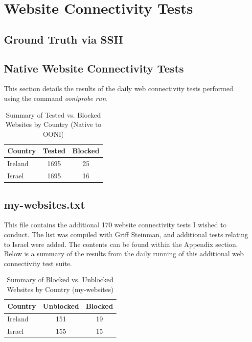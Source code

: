 \section{Website Connectivity Tests}


\subsection{Ground Truth via SSH}
\subsection{Native Website Connectivity Tests}
This section details the results of the daily web connectivity tests performed using the command \textit{ooniprobe run}. 

\begin{table}[H]
\centering
\caption{Summary of Tested vs. Blocked Websites by Country (Native to OONI)}
\begin{tabular}{lcc}
\toprule
\textbf{Country} & \textbf{Tested} & \textbf{Blocked} \\
\midrule
Ireland & 1695 & 25 \\
Israel    & 1695 & 16 \\   
\bottomrule
\end{tabular}
\label{tab:blocked_summary}
\end{table}




\subsection{my-websites.txt}
This file contains the additional 170 website connectivity tests I wished to conduct. The list was compiled with Griff Steinman, and additional tests relating to Israel were added. The contents can be found within the Appendix section. Below is a summary of the results from the daily running of this additional web connectivity test suite.

\begin{table}[H]
\centering
\caption{Summary of Blocked vs. Unblocked Websites by Country (my-websites)}
\begin{tabular}{lcc}
\toprule
\textbf{Country} & \textbf{Unblocked} & \textbf{Blocked} \\
\midrule
Ireland & 151 & 19 \\
Israel    & 155 & 15 \\   
\bottomrule
\end{tabular}
\label{tab:blocked_summary}
\end{table}

